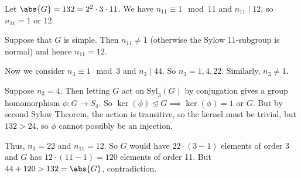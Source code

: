 \begin{example}
    Let \(\abs{G} = 132 = 2^2\cdot 3 \cdot 11\). We have \(n_{11}\equiv 1 \mod 11\) and \(n_{11}\mid 12\), so \(n_{11}=1\) or \(12\).

    Suppose that \(G\) is simple. Then \(n_{11} \neq 1\) (otherwise the Sylow 11-subgroup is normal) and hence \(n_{11} = 12\).

    Now we consider \(n_3 \equiv 1 \mod 3\) and \(n_3 \mid 44\). So \(n_3 = 1, 4, 22\). Similarly, \(n_3 \neq 1\).

    Suppose \(n_3 = 4\). Then letting \(G\) act on \(\mathrm{Syl}_{3}(G)\) by conjugation gives a group homomorphism \(\phi: G \to S_4\). So \(\ker (\phi) \trianglelefteq G \implies \ker(\phi)=1\) or \(G\). But by second Sylow Theorem, the action is transitive, so the kernel must be trivial, but \(132 > 24\), so \(\phi\) cannot possibly be an injection.

    Thus, \(n_{3} = 22\) and \(n_{11} = 12\). So \(G\) would have \(22\cdot(3-1)\) elements of order 3 and \(G\) has \(12 \cdot (11-1) = 120\) elements of order 11. But \(44 + 120 > 132 = \abs{G} \), contradiction.
\end{example}
